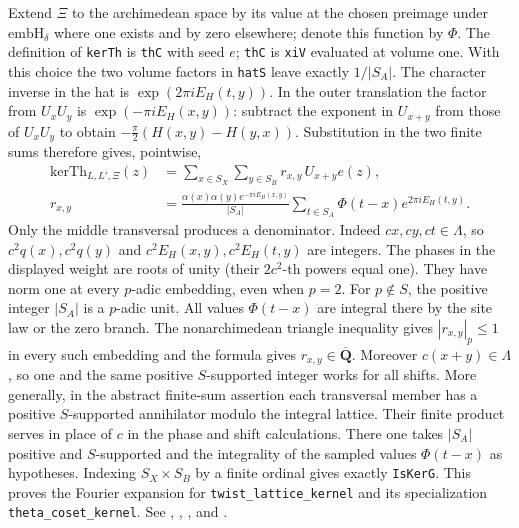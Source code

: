 Extend $\Xi$ to the archimedean space by its value at the chosen
preimage under $\mathrm{embH}_\delta$ where one exists and by zero
elsewhere; denote this function by $\Phi$.
The definition of \nolinkurl{kerTh} is \nolinkurl{thC} with seed $e$;
\nolinkurl{thC} is \nolinkurl{xiV} evaluated at volume one.
With this choice the two volume factors in \nolinkurl{hatS} leave
exactly $1/|S_A|$. The character inverse in the hat is
$\exp(2\pi iE_H(t,y))$. In the outer translation the factor
from $U_xU_y$ is $\exp(-\pi iE_H(x,y))$: subtract the exponent in
$U_{x+y}$ from those of $U_xU_y$ to obtain
$-\frac\pi2(H(x,y)-H(y,x))$. Substitution in the two finite sums
therefore gives, pointwise,
\begin{align*}
 \mathrm{kerTh}_{L,L',\Xi}(z)
   &=\sum_{x\in S_X}\sum_{y\in S_B}r_{x,y}\,U_{x+y}e(z),\\
 r_{x,y}&=\frac{\alpha(x)\alpha(y)e^{-\pi iE_H(x,y)}}{|S_A|}
       \sum_{t\in S_A}\Phi(t-x)e^{2\pi iE_H(t,y)} .
\end{align*}
Only the middle transversal produces a denominator.
Indeed $cx,cy,ct\in\Lambda$, so $c^2q(x),c^2q(y)$ and
$c^2E_H(x,y),c^2E_H(t,y)$ are integers. The phases in the displayed
weight are roots of unity (their $2c^2$-th powers equal one). They have
norm one at every $p$-adic embedding, even when $p=2$. For $p\notin S$,
the positive integer $|S_A|$ is a $p$-adic unit.
All values $\Phi(t-x)$ are integral there by the site law or the
zero branch. The nonarchimedean triangle inequality gives
$|r_{x,y}|_p\leq1$ in every such embedding and the formula gives
$r_{x,y}\in\overline{\mathbf Q}$. Moreover $c(x+y)\in\Lambda$, so one
and the same positive $S$-supported integer works for all shifts.
More generally, in the abstract finite-sum assertion each transversal
member has a positive $S$-supported annihilator modulo the integral
lattice. Their finite product serves in place of $c$ in the phase and
shift calculations. There one takes $|S_A|$ positive and $S$-supported
and the integrality of the sampled values $\Phi(t-x)$ as hypotheses.
Indexing $S_X\times S_B$ by a finite ordinal gives exactly
\nolinkurl{IsKerG}. This proves the Fourier expansion for
\nolinkurl{twist_lattice_kernel} and its specialization
\nolinkurl{theta_coset_kernel}. See ,
,
,
and .

